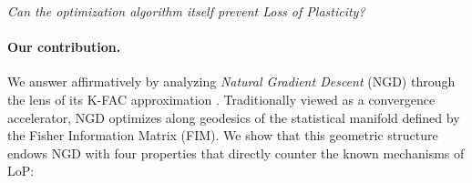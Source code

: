 \documentclass{article}
\theoremstyle{plain}
\theoremstyle{definition}
\theoremstyle{remark}
\begin{document}
\begin{center}
\emph{Can the optimization algorithm itself prevent Loss of Plasticity?}
\end{center}

\paragraph{Our contribution.} We answer affirmatively by analyzing \emph{Natural Gradient Descent} (NGD) \citep{amari1998natural} through the lens of its K-FAC approximation \citep{martens2015optimizing}. Traditionally viewed as a convergence accelerator, NGD optimizes along geodesics of the statistical manifold defined by the Fisher Information Matrix (FIM). We show that this geometric structure endows NGD with four properties that directly counter the known mechanisms of LoP:
\end{document}
